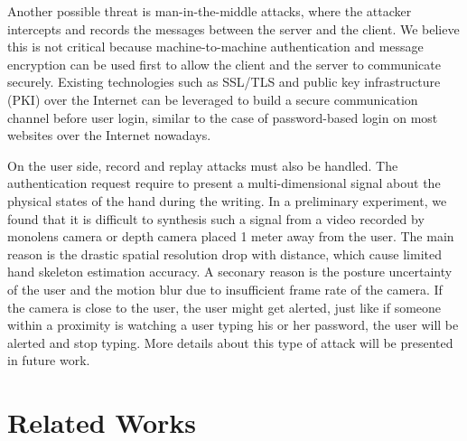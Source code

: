 \documentclass[conference]{IEEEtran}
\begin{document}
Another possible threat is man-in-the-middle attacks, where the attacker intercepts and records the messages between the server and the client. We believe this is not critical because machine-to-machine authentication and message encryption can be used first to allow the client and the server to communicate securely. Existing technologies such as SSL/TLS and public key infrastructure (PKI) over the Internet can be leveraged to build a secure communication channel before user login, similar to the case of password-based login on most websites over the Internet nowadays.

On the user side, record and replay attacks must also be handled. The authentication request require to present a multi-dimensional signal about the physical states of the hand during the writing. In a preliminary experiment, we found that it is difficult to synthesis such a signal from a video recorded by monolens camera or depth camera placed 1 meter away from the user. The main reason is the drastic spatial resolution drop with distance, which cause limited hand skeleton estimation accuracy. A seconary reason is the posture uncertainty of the user and the motion blur due to insufficient frame rate of the camera. If the camera is close to the user, the user might get alerted, just like if someone within a proximity is watching a user typing his or her password, the user will be alerted and stop typing. More details about this type of attack will be presented in future work.


\section{Related Works}
\end{document}
